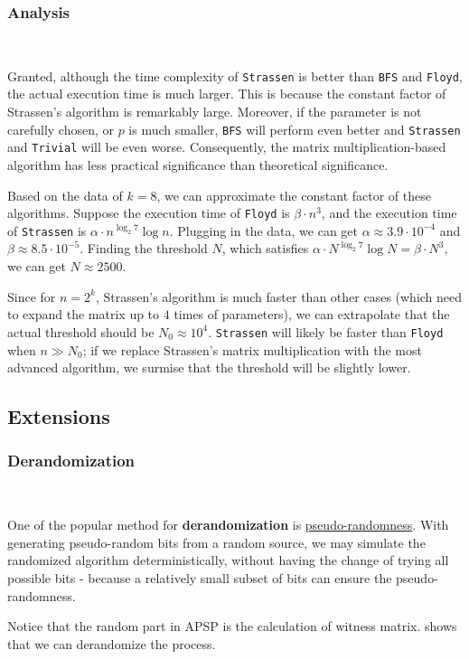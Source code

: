 \documentclass[11pt]{article}
\theoremstyle{plain}
\begin{document}
\subsubsection{Analysis}\

Granted, although the time complexity of \texttt{Strassen} is better than \texttt{BFS} and \texttt{Floyd}, the actual execution time is much larger. This is because the constant factor of Strassen's algorithm is remarkably large. Moreover, if the parameter is not carefully chosen, or $p$ is much smaller, \texttt{BFS} will perform even better and \texttt{Strassen} and \texttt{Trivial} will be even worse. Consequently, the matrix multiplication-based algorithm has less practical significance than theoretical significance.

Based on the data of $k=8$, we can approximate the constant factor of these algorithms. Suppose the execution time of \texttt{Floyd} is $\beta\cdot n^3$, and the execution time of \texttt{Strassen} is $\alpha\cdot n^{\log_2 7}\log n$. Plugging in the data, we can get $\alpha\approx 3.9\cdot 10^{-4}$ and $\beta\approx 8.5\cdot 10^{-5}$. Finding the threshold $N$, which satisfies $\alpha\cdot N^{\log_2 7}\log N=\beta\cdot N^3$, we can get $N\approx 2500$. 

Since for $n=2^k$, Strassen's algorithm is much faster than other cases (which need to expand the matrix up to $4$ times of parameters), we can extrapolate that the actual threshold should be $N_0\approx 10^4$. \texttt{Strassen} will likely be faster than \texttt{Floyd} when $n\gg N_0$; if we replace Strassen's matrix multiplication with the most advanced algorithm, we surmise that the threshold will be slightly lower.

\subsection{Extensions}

\subsubsection{Derandomization}\

One of the popular method for \textbf{derandomization} is \underline{pseudo-randomness}. With generating pseudo-random bits from a random source, we may simulate the randomized algorithm deterministically, without having the change of trying all possible bits - because a relatively small subset of bits can ensure the pseudo-randomness.

Notice that the random part in APSP is the calculation of witness matrix. \cite{267748} shows that we can derandomize the process. 
\end{document}
